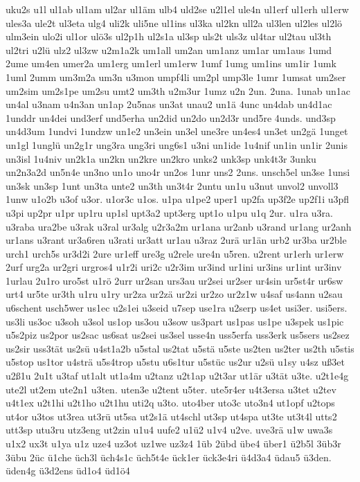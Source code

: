 {uku2s
u1l
ul1ab
ul1am
ul2ar
ul1äm
ulb4
uld2se
u2l1el
ule4n
ul1erf
ul1erh
ul1erw
ules3a
ule2t
ul3eta
ulg4
uli2k
uli5ne
ul1ins
ul3ka
ul2kn
ull2a
ul3len
ul2les
ul2lö
ulm3ein
ulo2i
ul1or
ulö3s
ul2p1h
ul2s1a
ul3sp
uls2t
uls3z
ul4tar
ul2tau
ul3th
ul2tri
u2lü
ulz2
ul3zw
u2m1a2k
um1all
um2an
um1anz
um1ar
um1aus
1umd
2ume
um4en
umer2a
um1erg
um1erl
um1erw
1umf
1umg
um1ins
um1ir
1umk
1uml
2umm
um3m2a
um3n
u3mon
umpf4li
um2pl
ump3le
1umr
1umsat
um2ser
um2sim
um2s1pe
um2su
umt2
um3th
u2m3ur
1umz
u2n
2un.
2una.
1unab
un1ac
un4al
u3nam
u4n3an
un1ap
2u5nas
un3at
unau2
un1ä
4unc
un4dab
un4d1ac
1unddr
un4dei
und3erf
und5erha
un2did
un2do
un2d3r
und5re
4unds.
und3sp
un4d3um
1undvi
1undzw
un1e2
un3ein
un3el
une3re
un4es4
un3et
un2gä
1unget
un1gl
1unglü
un2g1r
ung3ra
ung3ri
ung6s1
u3ni
un1ide
1u4nif
un1in
un1ir
2unis
un3isl
1u4niv
un2k1a
un2kn
un2kre
un2kro
unks2
unk3sp
unk4t3r
3unku
un2n3a2d
un5n4e
un3no
un1o
uno4r
un2os
1unr
uns2
2uns.
unsch5el
un3se
1unsi
un3sk
un3sp
1unt
un3ta
unte2
un3th
un3t4r
2untu
un1u
u3nut
unvol2
unvoll3
1unw
u1o2b
u3of
u3or.
u1or3c
u1os.
u1pa
u1pe2
uper1
up2fa
up3f2e
up2f1i
u3pfl
u3pi
up2pr
u1pr
up1ru
up1sl
upt3a2
upt3erg
upt1o
u1pu
u1q
2ur.
u1ra
u3ra.
u3raba
ura2be
u3rak
u3ral
ur3alg
u2r3a2m
ur1ana
ur2anb
u3rand
ur1ang
ur2anh
ur1ans
u3rant
ur3a6ren
u3rati
ur3att
ur1au
u3raz
2urä
ur1än
urb2
ur3ba
ur2ble
urch1
urch5s
ur3d2i
2ure
ur1eff
ure3g
u2rele
ure4n
u5ren.
u2rent
ur1erh
ur1erw
2urf
urg2a
ur2gri
urgros4
u1r2i
uri2c
u2r3im
ur3ind
ur1ini
ur3ins
ur1int
ur3inv
1urlau
2u1ro
uro5st
u1rö
2urr
ur2san
urs3au
ur2sei
ur2ser
ur4sin
ur5st4r
ur6sw
urt4
ur5te
ur3th
u1ru
u1ry
ur2za
ur2zä
ur2zi
ur2zo
ur2z1w
u4saf
us4ann
u2sau
u6schent
usch5wer
us1ec
u2s1ei
u3seid
u7sep
use1ra
u2serp
us4et
usi3er.
usi5ers.
us3li
us3oc
u3soh
u3sol
us1op
us3ou
u3sow
us3part
us1pas
us1pe
u3spek
us1pic
u5s2piz
us2por
us2sac
us6sat
us2sei
us3sel
usse4n
uss5erfa
uss3erk
us5sers
us2sez
us2sir
uss3tät
us2sü
u4st1a2b
u5stal
us2tat
u5stä
u5ste
us2ten
us2ter
us2th
u5stis
u5stop
us1tor
u4strä
u5s4trop
u5stu
u6s1tur
u5stüc
us2ur
u2sü
u1sy
u4sz
uß3et
u2ß1u
2u1t
u3taf
ut1alt
ut1a4m
u2tanz
u2t1ap
u2t3ar
ut1är
u3tät
u3te.
u2t1e4g
ute2l
ut2em
ute2n1
u3ten.
uten3e
u2tent
u5ter.
ute5r4er
u4t3ersa
u3tet
u2tev
u4t1ex
u2t1hi
u2t1ho
u2t1hu
uti2q
u3to.
uto4ber
uto3c
uto3n4
ut1opf
u2tops
ut4or
u3tos
ut3rea
ut3rü
ut5sa
ut2s1ä
ut4schl
ut3sp
ut4spa
ut3te
ut3t4l
utts2
utt3sp
utu3ru
utz3eng
ut2zin
u1u4
uufe2
u1ü2
u1v4
u2ve.
uve3rä
u1w
uwa3s
u1x2
ux3t
u1ya
u1z
uze4
uz3ot
uz1we
uz3z4
1üb
2übd
übe4
über1
ü2b5l
3üb3r
3übu
2üc
ü1che
üch3l
üch4s1c
üch5t4e
ück1er
ück3e4ri
ü4d3a4
üdau5
ü3den.
üden4g
ü3d2ens
üd1o4
üd1ö4
}
